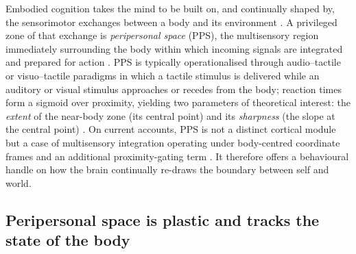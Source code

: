 Embodied cognition takes the mind to be built on, and continually shaped by, the sensorimotor exchanges between a body and its environment \citep{Glenberg2010, Barsalou2008, barsalou2008grounded}. A privileged zone of that exchange is \emph{peripersonal space} (PPS), the multisensory region immediately surrounding the body within which incoming signals are integrated and prepared for action \citep{rizzolatti1997space, diPellegrino2015, Serino2019}. PPS is typically operationalised through audio--tactile or visuo--tactile paradigms in which a tactile stimulus is delivered while an auditory or visual stimulus approaches or recedes from the body; reaction times form a sigmoid over proximity, yielding two parameters of theoretical interest: the \emph{extent} of the near-body zone (its central point) and its \emph{sharpness} (the slope at the central point) \citep{Canzoneri2012, teneggi2013social, Bufacchi2018, Basile2024}. On current accounts, PPS is not a distinct cortical module but a case of multisensory integration operating under body-centred coordinate frames and an additional proximity-gating term \citep{noel_2018, bertoni_2025, straka_2022}. It therefore offers a behavioural handle on how the brain continually re-draws the boundary between self and world.

\subsection{Peripersonal space is plastic and tracks the state of the body}


